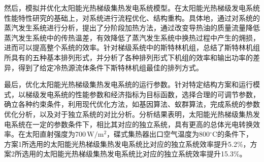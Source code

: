 {    然后，模拟并优化太阳能光热梯级集热发电系统模型。在太阳能光热梯级发电系统性能特性研究的基础上，对系统进行流程优化、结构重构。具体地，通过对系统的蒸汽发生系统进行分析，提出了分阶段加热方法，通过改变导热油的质量流量降低蒸汽发生系统中的传热温差，有效降低了蒸汽发生系统中换热过程中产生的㶲损，进而可以提高整个系统的效率。针对梯级系统中的斯特林机组，总结了斯特林机组所具有的五种基本排列形式，并分析了各种排列形式下机组的效率和输出功率的差异，得到了给定冷热源流体条件下斯特林机组最佳的排列方式。

    最后，优化太阳能光热梯级集热发电系统的运行参数。针对特定结构方案和运行模式，以梯级发电系统的性能参数和经济指标为目标函数，选择合理的可调节参数，确立各种约束条件，利用现代优化方法，如基因算法、蚁群算法，完成系统的参数优化分析，以及对于独立系统的对比分析。分析结果表明，太阳能光热梯级集热发电系统在一定的参数条件下，相比其对应的独立系统，具有更高的总体光电转换效率。在太阳直射强度为700\,$\mathrm{W/m^2}$，碟式集热器出口空气温度为800$\mathrm{^\circ C}$的条件下，方案1所选用的太阳能光热梯级集热发电系统比对应的独立系统效率提升5.2\%，方案2所选用的太阳能光热梯级集热发电系统比对应的独立系统效率提升15.3\%。

}

